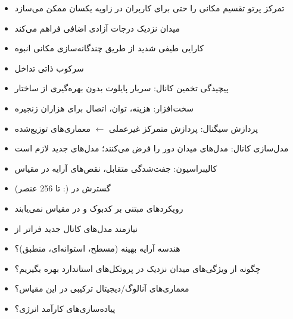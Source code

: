 

\begin{itemize}
\tightlist
\item
  تمرکز پرتو تقسیم مکانی را حتی برای کاربران در زاویه یکسان ممکن می‌سازد
\item
   میدان نزدیک درجات آزادی اضافی فراهم می‌کند
\item
  کارایی طیفی شدید از طریق چندگانه‌سازی مکانی انبوه
\item
  سرکوب ذاتی تداخل
\end{itemize}


\begin{itemize}
\tightlist
\item
  پیچیدگی تخمین کانال: سربار پایلوت  بدون بهره‌گیری از ساختار
\item
  سخت‌افزار: هزینه، توان، اتصال برای هزاران زنجیره 
\item
  پردازش سیگنال: پردازش متمرکز غیرعملی \ensuremath{\leftarrow} معماری‌های توزیع‌شده
\item
  مدل‌سازی کانال: مدل‌های  میدان دور را فرض می‌کنند؛ مدل‌های جدید لازم است
\item
  کالیبراسیون: جفت‌شدگی متقابل، نقص‌های آرایه در مقیاس
\end{itemize}


\begin{itemize}
\tightlist
\item
  گسترش  در  (: تا 256 عنصر)
\item
  رویکردهای مبتنی بر کدبوک و  در  مقیاس نمی‌یابند
\item
  نیازمند مدل‌های کانال جدید فراتر از 
\end{itemize}


\begin{itemize}
\tightlist
\item
  هندسه آرایه بهینه (مسطح، استوانه‌ای، منطبق)؟
\item
  چگونه از ویژگی‌های میدان نزدیک در پروتکل‌های استاندارد بهره بگیریم؟
\item
  معماری‌های آنالوگ/\allowbreak{}دیجیتال ترکیبی در این مقیاس؟
\item
  پیاده‌سازی‌های کارآمد انرژی؟
\end{itemize}

